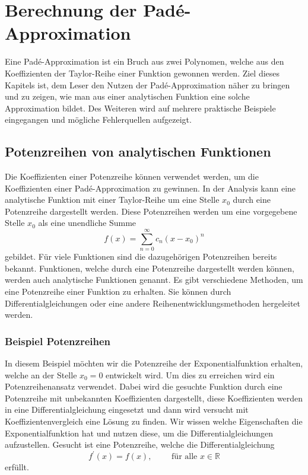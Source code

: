 %
%
%

\section{Berechnung der Padé-Approximation
\label{pade:section:Problemstellung}}
Eine Padé-Approximation ist ein Bruch aus zwei Polynomen, welche aus den Koeffizienten der Taylor-Reihe einer Funktion gewonnen werden. 
Ziel dieses Kapitels ist, dem Leser den Nutzen der Padé-Approximation näher zu bringen und zu zeigen, wie man aus einer analytischen Funktion eine solche Approximation bildet.
Des Weiteren wird auf mehrere praktische Beispiele eingegangen und mögliche Fehlerquellen aufgezeigt. 



\subsection{Potenzreihen von analytischen Funktionen
\label{pade:subsection:Potenzreihen}}
Die Koeffizienten einer Potenzreihe können verwendet werden, um die Koeffizienten einer Padé-Approximation zu gewinnen. 
In der Analysis kann eine analytische Funktion mit einer Taylor-Reihe um eine Stelle $x_{0}$ durch eine Potenzreihe dargestellt werden. 
Diese Potenzreihen werden um eine vorgegebene Stelle $x_{0}$ als eine unendliche Summe 
\begin{equation}
f(x)=\sum_{n=0}^{\infty} c_{n} (x-x_{0})^{n} 
\label{pade:expofunk}
\end{equation}
gebildet.
Für viele Funktionen sind die dazugehörigen Potenzreihen bereits bekannt. 
Funktionen, welche durch eine Potenzreihe dargestellt werden können, werden auch analytische Funktionen genannt.
Es gibt verschiedene Methoden, um eine Potenzreihe einer Funktion zu erhalten. 
Sie können durch Differentialgleichungen oder eine andere Reihenentwicklungsmethoden hergeleitet werden.

\subsubsection{Beispiel Potenzreihen
\label{pade:section:Bsp_Potenzreihen}}
In diesem Beispiel möchten wir die Potenzreihe der Exponentialfunktion erhalten, welche an der Stelle $x_0 = 0$ entwickelt wird.
Um dies zu erreichen wird ein Potenzreihenansatz verwendet.
Dabei wird die gesuchte Funktion durch eine Potenzreihe mit unbekannten Koeffizienten dargestellt, diese Koeffizienten werden in eine Differentialgleichung eingesetzt und dann wird versucht mit Koeffizientenvergleich  eine Lösung zu finden.
Wir wissen welche Eigenschaften die Exponentialfunktion hat und nutzen diese, um die Differentialgleichungen aufzustellen. 
Gesucht ist eine Potenzreihe, welche die Differentialgleichung 
\begin{equation*}
	f^{\prime}(x) = f(x) , \qquad \text{ für alle } x \in \mathbb{R} 
\end{equation*}
erfüllt.

